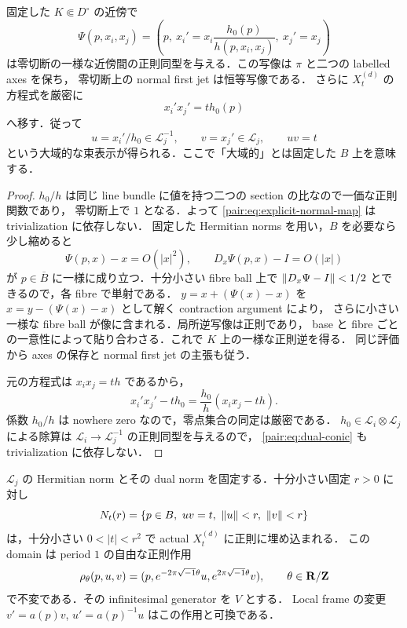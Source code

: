 \begin{proposition}
\label{pair:prop:bundle-conic}
固定した $K\Subset D^\circ$ の近傍で
\begin{equation}\label{pair:eq:explicit-normal-map}
 \Psi(p,x_i,x_j)
 =\left(p,\ x_i'=x_i\frac{h_0(p)}{h(p,x_i,x_j)},\ x_j'=x_j\right)
\end{equation}
は零切断の一様な近傍間の正則同型を与える．この写像は $\pi$ と二つの labelled axes を保ち，
零切断上の normal first jet は恒等写像である．
さらに $X_t^{(d)}$ の方程式を厳密に
\begin{equation}\label{pair:eq:bundle-conic}
 x_i'x_j'=t h_0(p)
\end{equation}
へ移す．従って
\begin{equation}\label{pair:eq:dual-conic}
 u=x_i'/h_0\in\mathcal L_j^{-1},\qquad
 v=x_j'\in\mathcal L_j,
 \qquad uv=t
\end{equation}
という大域的な束表示が得られる．ここで「大域的」とは固定した $B$ 上を意味する．
\end{proposition}

\begin{proof}
$h_0/h$ は同じ line bundle に値を持つ二つの section の比なので一価な正則関数であり，
零切断上で $1$ となる．よって \eqref{pair:eq:explicit-normal-map} は trivialization に依存しない．
固定した Hermitian norms を用い，$B$ を必要なら少し縮めると
\[
 \Psi(p,x)-x=O(|x|^2),\qquad
 D_x\Psi(p,x)-I=O(|x|)
\]
が $p\in\overline B$ に一様に成り立つ．十分小さい fibre ball 上で
$\left\lVert D_x\Psi-I\right\rVert<1/2$ とできるので，各 fibre で単射である．
$y=x+(\Psi(x)-x)$ を $x=y-(\Psi(x)-x)$ として解く contraction argument により，
さらに小さい一様な fibre ball が像に含まれる．局所逆写像は正則であり，
base と fibre ごとの一意性によって貼り合わさる．これで $K$ 上の一様な正則逆を得る．
同じ評価から axes の保存と normal first jet の主張も従う．

元の方程式は $x_ix_j=t h$ であるから，
\[
 x_i'x_j'-t h_0
 =\frac{h_0}{h}(x_ix_j-t h).
\]
係数 $h_0/h$ は nowhere zero なので，零点集合の同定は厳密である．
$h_0\in\mathcal L_i\otimes\mathcal L_j$ による除算は
$\mathcal L_i\to\mathcal L_j^{-1}$ の正則同型を与えるので，
\eqref{pair:eq:dual-conic} も trivialization に依存しない．
\end{proof}

\begin{corollary}
\label{pair:cor:normal-circle}
$\mathcal L_j$ の Hermitian norm とその dual norm を固定する．十分小さい固定 $r>0$ に対し
\begin{equation}\label{pair:eq:neck-domain}
 N_t(r)=\{p\in B,\ uv=t,\ \left\lVert u\right\rVert<r,\ \left\lVert v\right\rVert<r\}
\end{equation}
は，十分小さい $0<|t|<r^2$ で actual $X_t^{(d)}$ に正則に埋め込まれる．
この domain は period $1$ の自由な正則作用
\begin{equation}\label{pair:eq:normal-circle}
 \rho_\theta(p,u,v)=(p,e^{-2\pi\sqrt{-1}\theta}u,
 e^{2\pi\sqrt{-1}\theta}v),\qquad\theta\in\mathbf R/\mathbf Z
\end{equation}
で不変である．その infinitesimal generator を $V$ とする．
Local frame の変更 $v'=a(p)v$, $u'=a(p)^{-1}u$ はこの作用と可換である．
\end{corollary}

